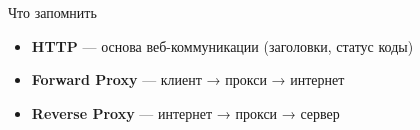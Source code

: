 \documentclass[aspectratio=169]{beamer}
\begin{document}
    \begin{frame}{Что запомнить}
        \begin{itemize}
            \item \textbf{HTTP} — основа веб-коммуникации (заголовки, статус коды)
            \item \textbf{Forward Proxy} — клиент → прокси → интернет
            \item \textbf{Reverse Proxy} — интернет → прокси → сервер
        \end{itemize}
    \end{frame}
\end{document}
